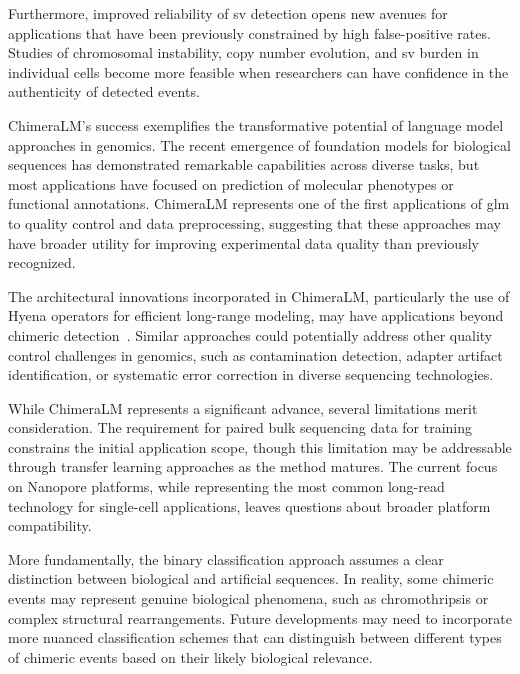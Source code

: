 \documentclass[pdflatex,sn-nature]{sn-jnl}%
\theoremstyle{thmstyleone}%
\theoremstyle{thmstyletwo}%
\theoremstyle{thmstylethree}%
\begin{document}
Furthermore, improved reliability of \gls{sv} detection opens new avenues for applications that have been previously constrained by high false-positive rates.
Studies of chromosomal instability, copy number evolution, and \gls{sv} burden in individual cells become more feasible when researchers can have confidence in the authenticity of detected events.

ChimeraLM's success exemplifies the transformative potential of language model approaches in genomics.
The recent emergence of foundation models for biological sequences has demonstrated remarkable capabilities across diverse tasks, but most applications have focused on prediction of molecular phenotypes or functional annotations.
ChimeraLM represents one of the first applications of \gls{glm} to quality control and data preprocessing, suggesting that these approaches may have broader utility for improving experimental data quality than previously recognized.

The architectural innovations incorporated in ChimeraLM, particularly the use of Hyena operators for efficient long-range modeling, may have applications beyond chimeric detection~\cite{Poli2023HyenaHT, nguyen2023hyenadna}.
Similar approaches could potentially address other quality control challenges in genomics, such as contamination detection, adapter artifact identification, or systematic error correction in diverse sequencing technologies.

While ChimeraLM represents a significant advance, several limitations merit consideration.
The requirement for paired bulk sequencing data for training constrains the initial application scope, though this limitation may be addressable through transfer learning approaches as the method matures.
The current focus on Nanopore platforms, while representing the most common long-read technology for single-cell applications, leaves questions about broader platform compatibility.

More fundamentally, the binary classification approach assumes a clear distinction between biological and artificial sequences.
In reality, some chimeric events may represent genuine biological phenomena, such as chromothripsis or complex structural rearrangements.
Future developments may need to incorporate more nuanced classification schemes that can distinguish between different types of chimeric events based on their likely biological relevance.
\end{document}
